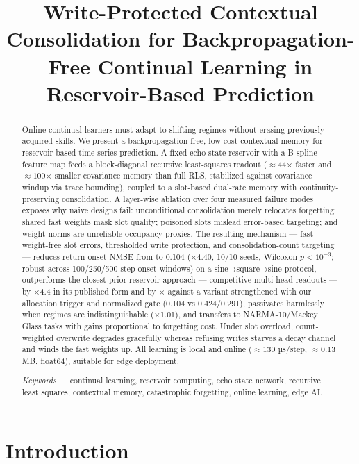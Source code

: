 \documentclass[11pt]{article}
\title{Write-Protected Contextual Consolidation for
Backpropagation-Free Continual Learning in Reservoir-Based
Prediction}
\author{}
\date{}
\begin{document}
\maketitle
\begin{abstract}
Online continual learners must adapt to shifting regimes without erasing
previously acquired skills. We present a backpropagation-free, low-cost
contextual memory for reservoir-based time-series prediction. A fixed
echo-state reservoir with a B-spline feature map feeds a block-diagonal
recursive least-squares readout (\(\approx 44\)× faster and
\(\approx 100\)× smaller covariance memory than full RLS, stabilized
against covariance windup via trace bounding), coupled to a slot-based
dual-rate memory with continuity-preserving consolidation. A layer-wise
ablation over four measured failure modes exposes why naive designs
fail: unconditional consolidation
merely relocates forgetting; shared fast weights mask slot quality;
poisoned slots mislead error-based targeting; and weight norms are
unreliable occupancy proxies. The resulting mechanism ---
fast-weight-free slot errors, thresholded write protection, and
consolidation-count targeting --- reduces return-onset NMSE from \blockOnset{} to
0.104 (×4.40, 10/10 seeds, Wilcoxon \(p<10^{-3}\); robust across
100/250/500-step onset windows) on a sine→square→sine protocol,
outperforms the closest prior reservoir approach --- competitive
multi-head readouts --- by ×4.4 in its published form and by \(\times\)\residualRatio{}
against a variant strengthened with our allocation trigger and
normalized gate (0.104 vs 0.424/0.291),
passivates harmlessly when regimes are
indistinguishable (×1.01), and transfers to NARMA-10/Mackey--Glass
tasks with gains proportional to forgetting cost. Under slot overload,
count-weighted overwrite degrades gracefully whereas refusing writes
starves a decay channel and winds the fast weights up. All learning is local
and online (\(\approx 130\) µs/step, \(\approx 0.13\) MB, float64), suitable
for edge deployment.

\emph{Keywords} --- continual learning, reservoir computing, echo state
network, recursive least squares, contextual memory, catastrophic
forgetting, online learning, edge AI.

\end{abstract}

\section{Introduction}\label{introduction}
\end{document}
